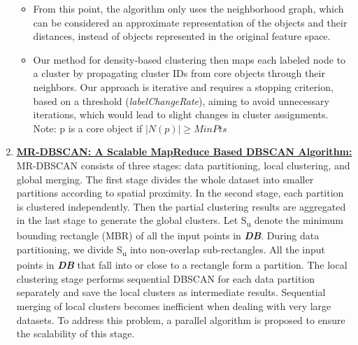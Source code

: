 \documentclass[acmsmall]{acmart}
\begin{document}
\begin{enumerate}
\begin{itemize}
        \item From this point, the algorithm only uses the neighborhood graph, which can be considered an approximate representation of the objects and their distances, instead of objects represented in the original feature space.
        \item Our method for density-based clustering then maps each labeled node to a cluster by propagating cluster IDs from core objects through their neighbors. Our approach is iterative and requires a stopping criterion, based on a threshold (\textit{labelChangeRate}), aiming to avoid unnecessary iterations, which would lead to slight changes in cluster assignments. Note: p is a core object if $|N(p)| \geq MinPts$
    \end{itemize}
    \vspace{8pt}
    
    \item \textcolor{blue}{\textbf{\href{https://link.springer.com/article/10.1007/s11704-013-3158-3}{MR-DBSCAN: A Scalable MapReduce Based DBSCAN Algorithm:}}}
    \newline
    MR-DBSCAN consists of three stages: data partitioning, local clustering, and global merging. The first stage divides the whole dataset into smaller partitions according to spatial proximity. In the second stage, each partition is clustered independently. Then the partial clustering results are aggregated in the last stage to generate the global clusters.
    \newline
    Let S\textsubscript{u} denote the minimum bounding rectangle (MBR) of all the input points in \textbf{\textit{DB}}. During data partitioning, we divide S\textsubscript{u} into non-overlap sub-rectangles. All the input points in \textbf{\textit{DB}} that fall into or close to a rectangle form a partition. The local clustering stage performs sequential DBSCAN for each data partition separately and save the local clusters as intermediate results. \newline
    Sequential merging of local clusters becomes inefficient when dealing with very large datasets. To address this problem, a parallel algorithm is proposed to ensure the scalability of this stage.
 
    \vspace{8pt}
    

\end{enumerate}
\end{document}
